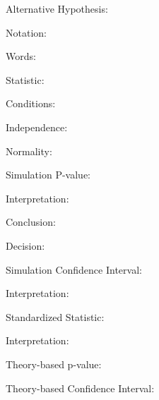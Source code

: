 \documentclass[
]{report}
\newcommand{\rgi}{\hspace{24pt}}  %
\begin{document}
\vspace{0.5in}

\rgi Alternative Hypothesis:

\rgi \rgi Notation:

\vspace{0.3in}

\rgi \rgi Words:

\vspace{0.5in}

\rgi Statistic:

\vspace{0.3in}

\rgi Conditions:

\rgi \rgi Independence:

\vspace{0.8in}

\rgi \rgi Normality:

\vspace{0.8in}

\rgi Simulation P-value:

\vspace{0.3in}

\rgi \rgi Interpretation:

\vspace{0.8in}

\rgi \rgi Conclusion:

\vspace{0.8in}

\rgi \rgi Decision:

\vspace{0.3in}

\rgi Simulation Confidence Interval:

\vspace{0.3in}

\rgi \rgi Interpretation:

\vspace{0.8in}

\rgi Standardized Statistic:

\vspace{0.3in}

\rgi \rgi Interpretation:

\vspace{0.8in}

\rgi Theory-based p-value:

\vspace{0.3in}

\rgi Theory-based Confidence Interval:

\vspace{0.5in}
\end{document}
